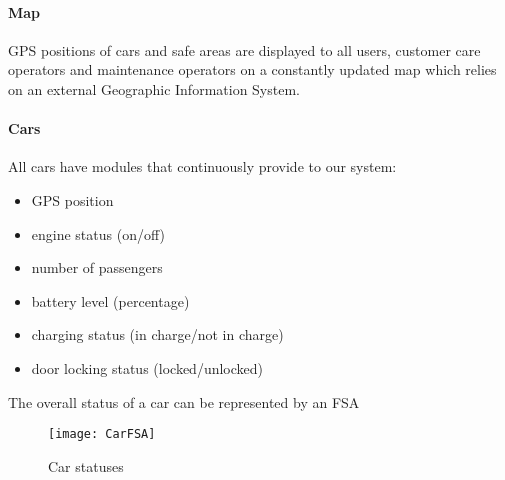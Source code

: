 	\paragraph{Map} GPS positions of cars and safe areas are displayed to all users, customer care operators and maintenance operators on a constantly updated map which relies on an external Geographic Information System.

	\paragraph{Cars}All cars have modules that continuously provide to our system:
	\begin{itemize}
		\item GPS position
		\item engine status (on/off)
		\item number of passengers
		\item battery level (percentage)
		\item charging status (in charge/not in charge)
		\item door locking status (locked/unlocked)
	\end{itemize}	
	The overall status of a car can be represented by an FSA
	\begin{figure}[h]
			\centering
			\texttt{[image: CarFSA]}
			\caption{
				\label{fig:carFSA} 
				Car statuses
			}
		\end{figure}
		
